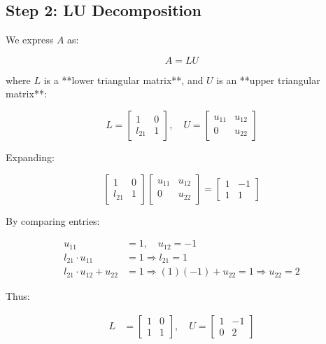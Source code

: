 \documentclass[journal]{IEEEtran}
\begin{document}
\subsection{Step 2: LU Decomposition}
We express \( A \) as:

\begin{equation}
    A = LU
\end{equation}

where \( L \) is a **lower triangular matrix**, and \( U \) is an **upper triangular matrix**:

\begin{equation}
    L = \begin{bmatrix} 1 & 0 \\ l_{21} & 1 \end{bmatrix}, \quad
    U = \begin{bmatrix} u_{11} & u_{12} \\ 0 & u_{22} \end{bmatrix}
\end{equation}

Expanding:

\begin{equation}
    \begin{bmatrix} 1 & 0 \\ l_{21} & 1 \end{bmatrix}
    \begin{bmatrix} u_{11} & u_{12} \\ 0 & u_{22} \end{bmatrix}
    =
    \begin{bmatrix} 1 & -1 \\ 1 & 1 \end{bmatrix}
\end{equation}

By comparing entries:

\begin{align}
    u_{11} &= 1, \quad u_{12} = -1 \\
    l_{21} \cdot u_{11} &= 1 \Rightarrow l_{21} = 1 \\
    l_{21} \cdot u_{12} + u_{22} &= 1 \Rightarrow (1)(-1) + u_{22} = 1 \Rightarrow u_{22} = 2
\end{align}

Thus:

\begin{align}
    L &= \begin{bmatrix} 1 & 0 \\ 1 & 1 \end{bmatrix}, \quad
    U = \begin{bmatrix} 1 & -1 \\ 0 & 2 \end{bmatrix}
\end{align}
\end{document}
